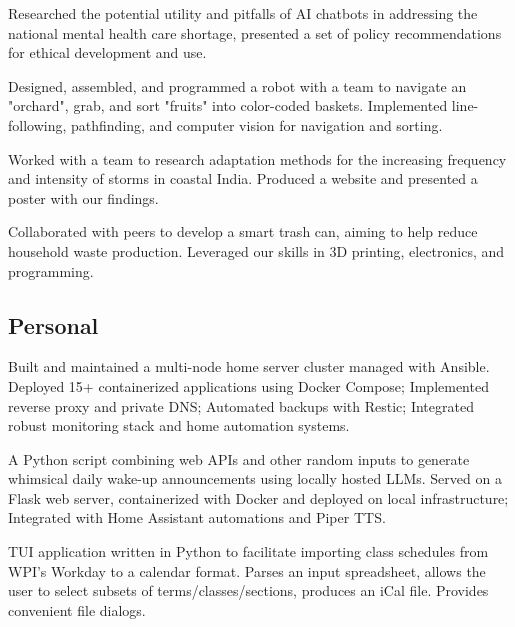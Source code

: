 \documentclass[10pt, roman]{moderncv}
\begin{document}
	{Researched the potential utility and pitfalls of AI chatbots in addressing the national mental health care shortage, presented a set of policy recommendations for ethical development and use.}
	
	{Designed, assembled, and programmed a robot with a team to navigate an "orchard", grab, and sort "fruits" into color-coded baskets. Implemented line-following, pathfinding, and computer vision for navigation and sorting.}

	{Worked with a team to research adaptation methods for the increasing frequency and intensity of storms in coastal India. Produced a website and presented a poster with our findings.}

	{Collaborated with peers to develop a smart trash can, aiming to help reduce household waste production. Leveraged our skills in 3D printing, electronics, and programming.}

\subsection{Personal}
	{Built and maintained a multi-node home server cluster managed with Ansible. Deployed 15+ containerized applications using Docker Compose; Implemented reverse proxy and private DNS; Automated backups with Restic; Integrated robust monitoring stack and home automation systems.}

	{A Python script combining web APIs and other random inputs to generate whimsical daily wake-up announcements using locally hosted LLMs. Served on a Flask web server, containerized with Docker and deployed on local infrastructure; Integrated with Home Assistant automations and Piper TTS.}
	
	{TUI application written in Python to facilitate importing class schedules from WPI's Workday to a calendar format. Parses an input spreadsheet, allows the user to select subsets of terms/classes/sections, produces an iCal file. Provides convenient file dialogs.}
	
\end{document}
